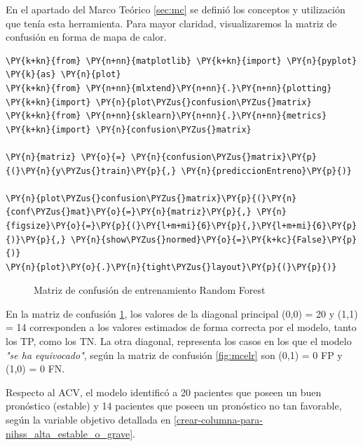 	En el apartado del Marco Teórico \ref{sec:mc} se definió los conceptos y utilización que tenía esta herramienta. Para mayor claridad, visualizaremos la matriz de confusión en forma de mapa de calor.

    \begin{tcolorbox}[breakable, size=fbox, boxrule=1pt, pad at break*=1mm,colback=cellbackground, colframe=cellborder]
\begin{Verbatim}[commandchars=\\\{\}]
\PY{k+kn}{from} \PY{n+nn}{matplotlib} \PY{k+kn}{import} \PY{n}{pyplot} \PY{k}{as} \PY{n}{plot}
\PY{k+kn}{from} \PY{n+nn}{mlxtend}\PY{n+nn}{.}\PY{n+nn}{plotting} \PY{k+kn}{import} \PY{n}{plot\PYZus{}confusion\PYZus{}matrix}
\PY{k+kn}{from} \PY{n+nn}{sklearn}\PY{n+nn}{.}\PY{n+nn}{metrics} \PY{k+kn}{import} \PY{n}{confusion\PYZus{}matrix}

\PY{n}{matriz} \PY{o}{=} \PY{n}{confusion\PYZus{}matrix}\PY{p}{(}\PY{n}{y\PYZus{}train}\PY{p}{,} \PY{n}{prediccionEntreno}\PY{p}{)}

\PY{n}{plot\PYZus{}confusion\PYZus{}matrix}\PY{p}{(}\PY{n}{conf\PYZus{}mat}\PY{o}{=}\PY{n}{matriz}\PY{p}{,} \PY{n}{figsize}\PY{o}{=}\PY{p}{(}\PY{l+m+mi}{6}\PY{p}{,}\PY{l+m+mi}{6}\PY{p}{)}\PY{p}{,} \PY{n}{show\PYZus{}normed}\PY{o}{=}\PY{k+kc}{False}\PY{p}{)}
\PY{n}{plot}\PY{o}{.}\PY{n}{tight\PYZus{}layout}\PY{p}{(}\PY{p}{)}
\end{Verbatim}
\end{tcolorbox}

\begin{center}
    	\begin{figure}[H]
	\centering
	\caption{Matriz de confusión de entrenamiento Random Forest}
	\label{fig:mcerf}
	\end{figure}
\end{center}
    
    En la matriz de confusión \ref{fig:mcerf}, los valores de la diagonal principal (0,0) = 20 y (1,1) = 14 corresponden a los valores estimados de forma correcta por el modelo, tanto los TP, como los TN. La otra diagonal, representa los casos en los que el modelo \textit{"se ha equivocado"}, según la matriz de confusión \ref{fig:mcelr} son (0,1) = 0 FP y (1,0) = 0 FN.
\par Respecto al ACV, el modelo identificó a 20 pacientes que poseen un buen pronóstico (estable) y 14 pacientes que poseen un pronóstico no tan favorable, según la variable objetivo detallada en \ref{crear-columna-para-nihss_alta_estable_o_grave}.\\
